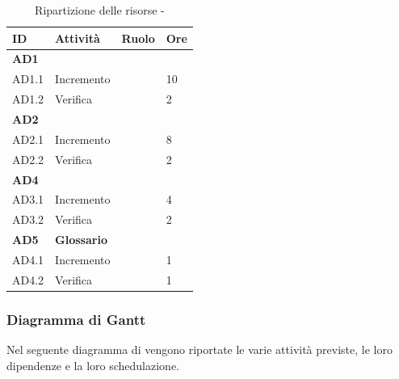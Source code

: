\documentclass[12pt,a4paper]{article}
\begin{document}
\begin{table}[H]
	\begin{center}
		\begin{tabular}{p{} p{} p{} p{}}
			\toprule
			\textbf{ID}	& \textbf{Attività}	& \textbf{Ruolo} & \textbf{Ore}\\ \midrule
			\midrule
			\textbf{AD1} & \textbf{\AdR{}} & &  \\ \midrule
			AD1.1 & Incremento & \AN{} & 10 \\ \midrule
			AD1.2 & Verifica & \VR{} & 2 \\ \midrule
			\textbf{AD2} & \textbf{\NdP{}} &  &  \\ \midrule
			AD2.1 & Incremento & \AM{} & 8 \\ \midrule
			AD2.2 & Verifica & \VR{} & 2 \\ \midrule
			\textbf{AD4} & \textbf{\PdQ{}} & &  \\ \midrule
			AD3.1 & Incremento & \RE{} & 4 \\ \midrule
			AD3.2 & Verifica & \VR{} & 2 \\ \midrule
			\textbf{AD5} & \textbf{Glossario} & &  \\ \midrule
			AD4.1 & Incremento & \VR{} & 1 \\ \midrule
			AD4.2 & Verifica & \VR{} & 1 \\
			\bottomrule
		\end{tabular}
		\caption{Ripartizione delle risorse - \FAD{}}
	\end{center}
\end{table}

\subsubsection{Diagramma di Gantt}
\label{gantt analisi di dettaglio}
Nel seguente diagramma di  vengono riportate le varie attività previste, le loro dipendenze e la loro schedulazione.
\end{document}
